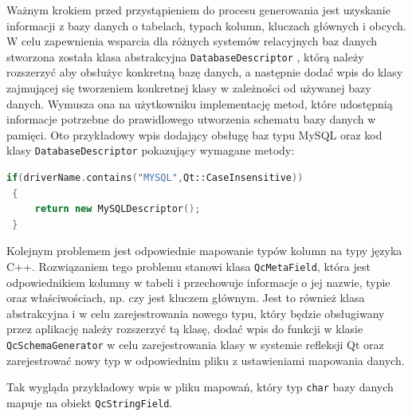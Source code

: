 \documentclass[12pt]{report}
\let\oldaddcontentsline\addcontentsline
\newcommand{\lstinputcplusplus}[2][]{{%
  \renewcommand{\lstlistingname}{C++ Code}%
  \renewcommand{\addcontentsline}[3]{\oldaddcontentsline{loc}{##2}{##3}}%
}}
\begin{document}
\begin{framed}
\lstinputcplusplus[caption={QcDatabase}]{additional/qcdatabase.h}
\end{framed}

Ważnym krokiem przed przystąpieniem do procesu generowania jest uzyskanie informacji z bazy danych o tabelach, typach kolumn, kluczach głównych i obcych. W celu zapewnienia wsparcia dla różnych systemów relacyjnych baz danych stworzona została klasa abstrakcyjna {\tt DatabaseDescriptor} , którą należy rozszerzyć aby obsłużyc konkretną bazę danych, a następnie dodać wpis do klasy zajmującej się tworzeniem konkretnej klasy w zależności od używanej bazy danych. Wymusza ona na użytkowniku implementację metod, które udostępnią informacje potrzebne do prawidlowego utworzenia schematu bazy danych w pamięci. Oto przykładowy wpis dodający obsługę baz typu MySQL oraz kod klasy {\tt DatabaseDescriptor} pokazujący wymagane metody:

\begin{framed}
\begin{lstlisting}[language=C++]
 if(driverName.contains("MYSQL",Qt::CaseInsensitive)) 
 {
     return new MySQLDescriptor();
 }
\end{lstlisting}
\end{framed}

\begin{framed}
\lstinputcplusplus[caption={DatabaseDescriptor}]{additional/databasedescriptor.h}
\end{framed}

Kolejnym problemem jest odpowiednie mapowanie typów kolumn na typy języka C++. Rozwiązaniem tego problemu stanowi klasa {\tt QcMetaField}, która jest odpowiednikiem kolumny w tabeli i przechowuje informacje o jej nazwie, typie oraz właściwościach, np. czy jest kluczem głównym. Jest to również klasa abstrakcyjna i w celu zarejestrowania nowego typu, który będzie obsługiwany przez aplikację należy rozszerzyć tą klasę, dodać wpis do funkcji w klasie {\tt QcSchemaGenerator} w celu zarejestrowania klasy w systemie refleksji Qt oraz zarejestrować nowy typ w odpowiednim pliku z ustawieniami mapowania danych.

\begin{framed}
\lstinputcplusplus[caption={QcMetaField}]{additional/qcmetafield.h}
\end{framed}

Tak wygląda przykładowy wpis w pliku mapowań, który typ {\tt char} bazy danych mapuje na obiekt {\tt QcStringField}. 
\end{document}

